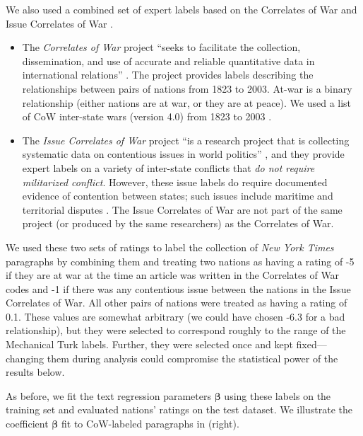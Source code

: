 We also used a combined set of expert labels based on the Correlates
of War \citep{sarkees:2010} and Issue Correlates of War
\citep{hensel:2001}.
\begin{itemize}
  \item The \emph{Correlates of War} project ``seeks to facilitate the
    collection, dissemination, and use of accurate and reliable
    quantitative data in international relations''
    \citep{cow_webpage:2012}.  The project provides labels describing the
    relationships between pairs of nations from 1823 to 2003.
    At-war is a binary relationship (either nations are at war, or
    they are at peace). We used a list of CoW inter-state wars
    (version 4.0) from 1823 to 2003
    \citep{sarkees:2010}.
  \item The \emph{Issue Correlates of War} project ``is a research
    project that is collecting systematic data on contentious issues
    in world politics'' \citep{icow_webpage:2012}, and they provide
    expert labels on a variety of inter-state conflicts that \emph{do
      not require militarized conflict}.  However, these issue labels
    do require documented evidence of contention between states; such
    issues include maritime and territorial disputes
    \citep{icow_webpage:2012,hensel:2001}. The Issue Correlates of War
    are not part of the same project (or produced by the same
    researchers) as the Correlates of War.
\end{itemize}

We used these two sets of ratings to label the collection of \emph{New
  York Times} paragraphs by combining them and treating two nations as
having a rating of -5 if they are at war at the time an article was
written in the Correlates of War codes and -1 if there was any
contentious issue between the nations in the Issue Correlates of War.
All other pairs of nations were treated as having a rating of 0.1.
These values are somewhat arbitrary (we could have chosen -6.3 for a
bad relationship), but they were selected to correspond roughly to the
range of the Mechanical Turk labels.  Further, they were selected once
and kept fixed---changing them during analysis could compromise the
statistical power of the results below.

As before, we fit the text regression parameters $\bm \beta$ using
these labels on the training set and evaluated nations' ratings on
the test dataset. We illustrate the coefficient $\bm \beta$ fit to
CoW-labeled paragraphs in  (right).

